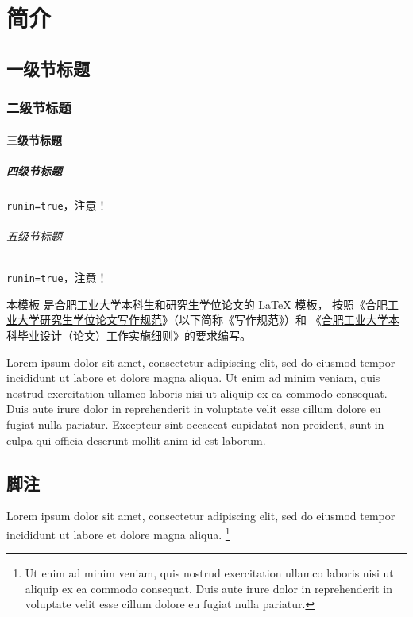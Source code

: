 
\chapter{简介}

\section{一级节标题}

\subsection{二级节标题}

\subsubsection{三级节标题}

\paragraph{四级节标题} \texttt{runin=true}，注意！

\subparagraph{五级节标题} \texttt{runin=true}，注意！

本模板  是合肥工业大学本科生和研究生学位论文的 \LaTeX{}
模板， 按照《\href{http://xwgl.hfut.edu.cn/2021/0419/c1975a253949/page.htm}
{合肥工业大学研究生学位论文写作规范}》（以下简称《写作规范》）和
《\href{http://xcjwb.hfut.edu.cn/53/cc/c1144a21452/page.htm}
{合肥工业大学本科毕业设计（论文）工作实施细则}》的要求编写。

Lorem ipsum dolor sit amet, consectetur adipiscing elit, sed do eiusmod tempor
incididunt ut labore et dolore magna aliqua.
Ut enim ad minim veniam, quis nostrud exercitation ullamco laboris nisi ut
aliquip ex ea commodo consequat.
Duis aute irure dolor in reprehenderit in voluptate velit esse cillum dolore eu
fugiat nulla pariatur.
Excepteur sint occaecat cupidatat non proident, sunt in culpa qui officia
deserunt mollit anim id est laborum.



\section{脚注}

Lorem ipsum dolor sit amet, consectetur adipiscing elit, sed do eiusmod tempor
incididunt ut labore et dolore magna aliqua.
\footnote{Ut enim ad minim veniam, quis nostrud exercitation ullamco laboris
  nisi ut aliquip ex ea commodo consequat.
  Duis aute irure dolor in reprehenderit in voluptate velit esse cillum dolore
  eu fugiat nulla pariatur.}
